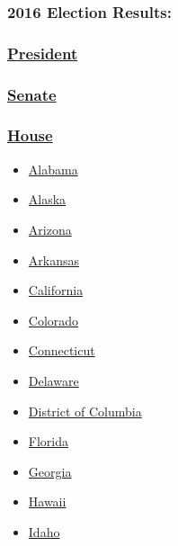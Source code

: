 \hypertarget{2016-election-results}{%
\subsubsection{2016 Election Results:}\label{2016-election-results}}

\hypertarget{president}{%
\subsubsection{\texorpdfstring{\href{https://www.nytimes3xbfgragh.onion/elections/results/president}{President}}{President}}\label{president}}

\hypertarget{senate}{%
\subsubsection{\texorpdfstring{\href{https://www.nytimes3xbfgragh.onion/elections/results/senate}{Senate}}{Senate}}\label{senate}}

\hypertarget{house}{%
\subsubsection{\texorpdfstring{\href{https://www.nytimes3xbfgragh.onion/elections/results/house}{House}}{House}}\label{house}}

\begin{itemize}
\tightlist
\item
  \href{https://www.nytimes3xbfgragh.onion/elections/results/alabama}{Alabama}
\item
  \href{https://www.nytimes3xbfgragh.onion/elections/results/alaska}{Alaska}
\item
  \href{https://www.nytimes3xbfgragh.onion/elections/results/arizona}{Arizona}
\item
  \href{https://www.nytimes3xbfgragh.onion/elections/results/arkansas}{Arkansas}
\item
  \href{https://www.nytimes3xbfgragh.onion/elections/results/california}{California}
\item
  \href{https://www.nytimes3xbfgragh.onion/elections/results/colorado}{Colorado}
\item
  \href{https://www.nytimes3xbfgragh.onion/elections/results/connecticut}{Connecticut}
\item
  \href{https://www.nytimes3xbfgragh.onion/elections/results/delaware}{Delaware}
\item
  \href{https://www.nytimes3xbfgragh.onion/elections/results/district-of-columbia}{District
  of Columbia}
\item
  \href{https://www.nytimes3xbfgragh.onion/elections/results/florida}{Florida}
\item
  \href{https://www.nytimes3xbfgragh.onion/elections/results/georgia}{Georgia}
\item
  \href{https://www.nytimes3xbfgragh.onion/elections/results/hawaii}{Hawaii}
\item
  \href{https://www.nytimes3xbfgragh.onion/elections/results/idaho}{Idaho}
\end{itemize}

